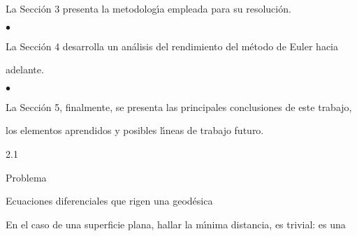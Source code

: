 \documentclass[a4paper,portrait,12pt]{article}
\begin{document}
\begin{flushleft}
La Sección 3 presenta la metodolog\i{}́a empleada para su resolución.
\end{flushleft}





$\bullet$





\begin{flushleft}
La Sección 4 desarrolla un análisis del rendimiento del método de Euler hacia
\end{flushleft}


\begin{flushleft}
adelante.
\end{flushleft}





$\bullet$





\begin{flushleft}
La Sección 5, finalmente, se presenta las principales conclusiones de este trabajo,
\end{flushleft}


\begin{flushleft}
los elementos aprendidos y posibles l\i{}́neas de trabajo futuro.
\end{flushleft}










2.1





\begin{flushleft}
Problema
\end{flushleft}





\begin{flushleft}
Ecuaciones diferenciales que rigen una geodésica
\end{flushleft}





\begin{flushleft}
En el caso de una superficie plana, hallar la m\i{}́nima distancia, es trivial: es una
\end{flushleft}
\end{document}
